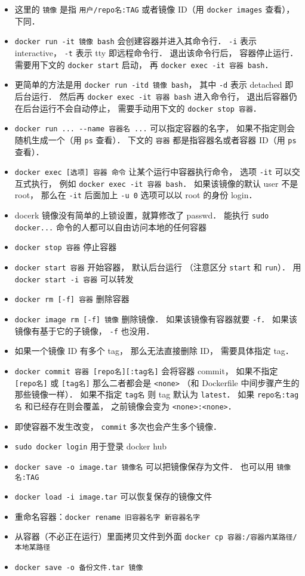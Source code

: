\begin{itemize}
\item 这里的 \verb|镜像| 是指 \verb|用户/repo名:TAG| 或者镜像 ID（用 \verb|docker images| 查看）， 下同．
\item \verb|docker run -it 镜像 bash| 会创建容器并进入其命令行． \verb|-i| 表示 interactive， \verb|-t| 表示 tty 即远程命令行． 退出该命令行后， 容器停止运行． 需要用下文的 \verb|docker start| 启动， 再 \verb|docker exec -it 容器 bash|．
\item 更简单的方法是用 \verb|docker run -itd 镜像 bash|， 其中 \verb|-d| 表示 detached 即后台运行． 然后再 \verb|docker exec -it 容器 bash| 进入命令行， 退出后容器仍在后台运行不会自动停止， 需要手动用下文的 \verb|docker stop 容器|．
\item \verb|docker run ... --name 容器名 ...| 可以指定容器的名字， 如果不指定则会随机生成一个（用 \verb|ps| 查看）． 下文的 \verb|容器| 都是指容器名或者容器 ID（用 \verb|ps| 查看）．
\item \verb`docker exec [选项] 容器 命令` 让某个运行中容器执行命令， 选项 \verb|-it| 可以交互式执行， 例如 \verb|docker exec -it 容器 bash|． 如果该镜像的默认 user 不是 root， 那么在 \verb|-it| 后面加上 \verb|-u 0| 选项可以以 root 的身份 login．
\item docerk 镜像没有简单的上锁设置，就算修改了 passwd． 能执行 \verb`sudo docker...` 命令的人都可以自由访问本地的任何容器
\item \verb`docker stop 容器` 停止容器
\item \verb`docker start 容器` 开始容器， 默认后台运行 （注意区分 \verb|start| 和 \verb|run|）． 用 \verb|docker start -i 容器| 可以转发
\item \verb`docker rm [-f] 容器` 删除容器
\item \verb`docker image rm [-f] 镜像` 删除镜像． 如果该镜像有容器就要 \verb|-f|． 如果该镜像有基于它的子镜像， \verb|-f| 也没用．
\item 如果一个镜像 ID 有多个 tag， 那么无法直接删除 ID， 需要具体指定 tag．
\item \verb`docker commit 容器 [repo名][:tag名]` 会将容器 commit， 如果不指定 \verb|[repo名]| 或 \verb|[tag名]| 那么二者都会是 \verb|<none>| （和 Dockerfile 中间步骤产生的那些镜像一样）． 如果不指定 \verb|tag名| 则 tag 默认为 \verb|latest|． 如果 \verb|repo名:tag名| 和已经存在则会覆盖， 之前镜像会变为 \verb|<none>:<none>|．
\item 即使容器不发生改变， \verb|commit| 多次也会产生多个镜像．
\item \verb`sudo docker login` 用于登录 docker hub
\item \verb|docker save -o image.tar 镜像名| 可以把镜像保存为文件． 也可以用 \verb|镜像名:TAG|
\item \verb|docker load -i image.tar| 可以恢复保存的镜像文件
\item 重命名容器：\verb|docker rename 旧容器名字 新容器名字|
\item 从容器（不必正在运行）里面拷贝文件到外面 \verb|docker cp 容器:/容器内某路径/ 本地某路径|
\item \verb|docker save -o 备份文件.tar 镜像|
\end{itemize}

